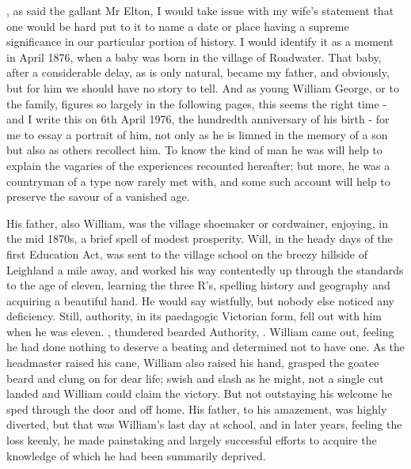 
, as said the gallant Mr Elton, I would take issue with my wife’s statement that one would be hard put to it to name a date or place having a supreme significance in our particular portion of history. I would identify it as a moment in April 1876, when a baby was born in the village of Roadwater. That baby, after a considerable delay, as is only natural, became my father, and obviously, but for him we should have no story to tell. And as young William George, or  to the family, figures so largely in the following pages, this seems the right time - and I write this on 6th April 1976, the hundredth anniversary of his birth - for me to essay a portrait of him, not only as he is limned in the memory of a son but also as others recollect him. To know the kind of man he was will help to explain the vagaries of the experiences recounted hereafter; but more, he was a countryman of a type now rarely met with, and some such account will help to preserve the savour of a vanished age.

His father, also William, was the village shoemaker or cordwainer, enjoying, in the mid 1870s, a brief spell of modest prosperity. Will, in the heady days of the first Education Act, was sent to the village school on the breezy hillside of Leighland a mile away, and worked his way contentedly up through the standards to the age of eleven, learning the three R’s, spelling history and geography and acquiring a beautiful hand. He would say wistfully,  but nobody else noticed any deficiency. Still, authority, in its paedagogic Victorian form, fell out with him when he was eleven. , thundered bearded Authority, . William came out, feeling he had done nothing to deserve a beating and determined not to have one. As the headmaster raised his cane, William also raised his hand, grasped the goatee beard and clung on for dear life; swish and slash as he might, not a single cut landed and William could claim the victory. But not outstaying his welcome he sped through the door and off home. His father, to his amazement, was highly diverted, but that was William's last day at school, and in later years, feeling the loss keenly, he made painstaking and largely successful efforts to acquire the knowledge of which he had been summarily deprived.

